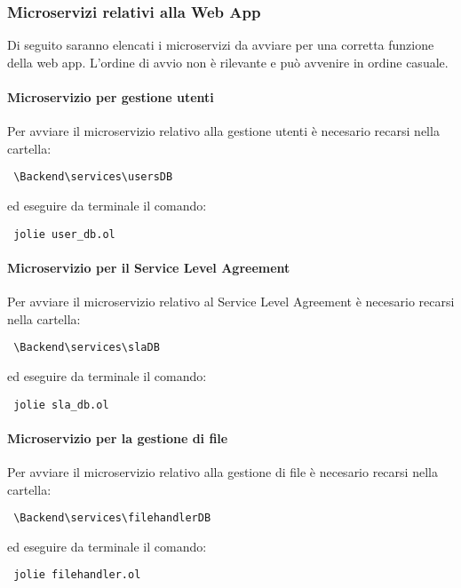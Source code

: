 \subsubsection{Microservizi relativi alla Web App}
Di seguito saranno elencati i microservizi da avviare per una corretta funzione della web app. L'ordine di avvio non è rilevante e può avvenire in ordine casuale.
	\paragraph{Microservizio per gestione utenti}
	Per avviare il microservizio relativo alla gestione utenti è necesario recarsi nella cartella:
	\begin{center}
		\verb| \Backend\services\usersDB|
	\end{center}
	
	ed eseguire da terminale il comando:
	
	\begin{center}
		\verb| jolie user_db.ol |
	\end{center}

	\paragraph{Microservizio per il Service Level Agreement}
	Per avviare il microservizio relativo al Service Level Agreement è necesario recarsi nella cartella:
	\begin{center}
		\verb| \Backend\services\slaDB|
	\end{center}
	
	ed eseguire da terminale il comando:
	
	\begin{center}
		\verb| jolie sla_db.ol |
	\end{center}

	\paragraph{Microservizio per la gestione di file}
	Per avviare il microservizio relativo alla gestione di file è necesario recarsi nella cartella:
	\begin{center}
		\verb| \Backend\services\filehandlerDB|
	\end{center}
	
	ed eseguire da terminale il comando:
	
	\begin{center}
		\verb| jolie filehandler.ol |
	\end{center}


